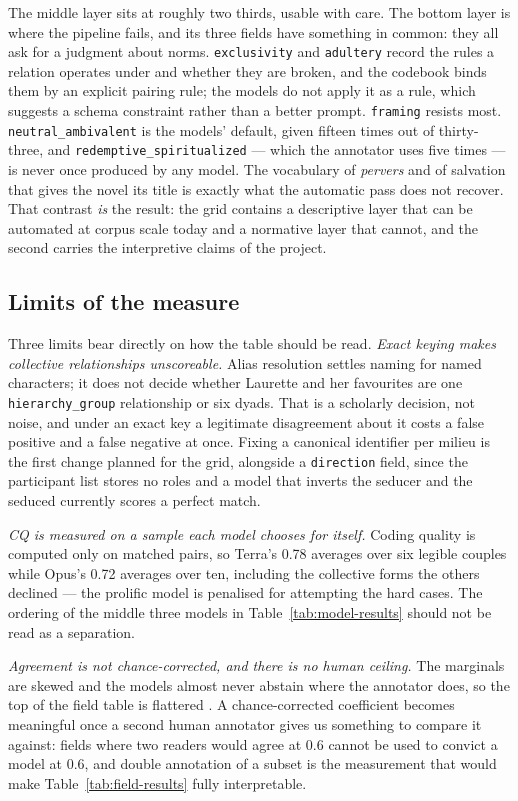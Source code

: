 The middle layer sits at roughly two thirds, usable with care. The bottom layer
is where the pipeline fails, and its three fields have something in common: they
all ask for a judgment about norms. \texttt{exclusivity} and \texttt{adultery}
record the rules a relation operates under and whether they are broken, and the
codebook binds them by an explicit pairing rule; the models do not apply it as a
rule, which suggests a schema constraint rather than a better prompt.
\texttt{framing} resists most. \texttt{neutral\_ambivalent} is the models'
default, given fifteen times out of thirty-three, and
\texttt{redemptive\_spiritualized} --- which the annotator uses five times --- is
never once produced by any model. The vocabulary of \emph{pervers} and of
salvation that gives the novel its title is exactly what the automatic pass does
not recover. That contrast \emph{is} the result: the grid contains a descriptive
layer that can be automated at corpus scale today and a normative layer that
cannot, and the second carries the interpretive claims of the project.

\subsection{Limits of the measure}

Three limits bear directly on how the table should be read. \emph{Exact keying
makes collective relationships unscoreable.} Alias resolution settles naming for
named characters; it does not decide whether Laurette and her favourites are one
\texttt{hierarchy\_group} relationship or six dyads. That is a scholarly
decision, not noise, and under an exact key a legitimate disagreement about it
costs a false positive and a false negative at once. Fixing a canonical
identifier per milieu is the first change planned for the grid, alongside a
\texttt{direction} field, since the participant list stores no roles and a model
that inverts the seducer and the seduced currently scores a perfect match.

\emph{CQ is measured on a sample each model chooses for itself.} Coding quality
is computed only on matched pairs, so Terra's 0.78 averages over six legible
couples while Opus's 0.72 averages over ten, including the collective forms the
others declined --- the prolific model is penalised for attempting the hard
cases. The ordering of the middle three models in
Table~\ref{tab:model-results} should not be read as a separation.

\emph{Agreement is not chance-corrected, and there is no human ceiling.} The
marginals are skewed and the models almost never abstain where the annotator
does, so the top of the field table is flattered \cite{dieugenio2004kappa}. A
chance-corrected coefficient becomes meaningful once a second human annotator
gives us something to compare it against: fields where two readers would agree
at 0.6 cannot be used to convict a model at 0.6, and double annotation of a
subset is the measurement that would make
Table~\ref{tab:field-results} fully interpretable.

